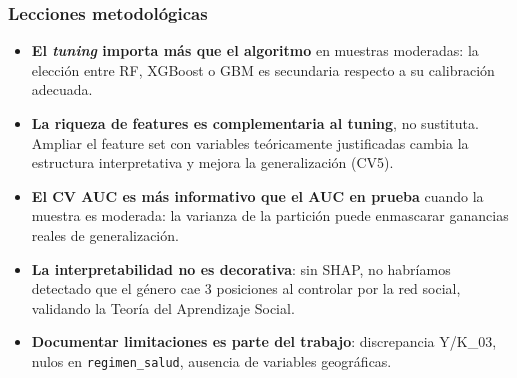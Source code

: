 \begin{frame}
\frametitle{Lecciones metodológicas}
\begin{itemize}
    \item \textbf{El \textit{tuning} importa más que el algoritmo} en muestras moderadas: la elección entre RF, XGBoost o GBM es secundaria respecto a su calibración adecuada.

    \vspace{0.15cm}
    \item \textbf{La riqueza de features es complementaria al tuning}, no sustituta. Ampliar el feature set con variables teóricamente justificadas cambia la estructura interpretativa y mejora la generalización (CV5).

    \vspace{0.15cm}
    \item \textbf{El CV AUC es más informativo que el AUC en prueba} cuando la muestra es moderada: la varianza de la partición puede enmascarar ganancias reales de generalización.

    \vspace{0.15cm}
    \item \textbf{La interpretabilidad no es decorativa}: sin SHAP, no habríamos detectado que el género cae 3 posiciones al controlar por la red social, validando la Teoría del Aprendizaje Social.

    \vspace{0.15cm}
    \item \textbf{Documentar limitaciones es parte del trabajo}: discrepancia Y/K\_03, nulos en \texttt{regimen\_salud}, ausencia de variables geográficas.
\end{itemize}
\end{frame}

